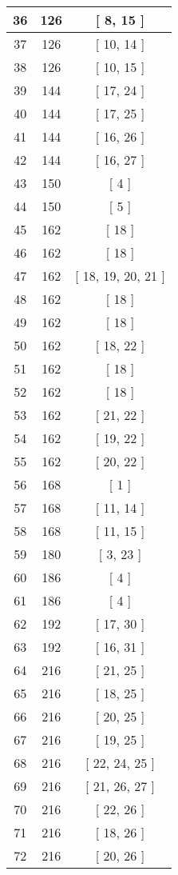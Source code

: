 \begin{center}
\begin{longtable}[H]{|| c c c ||}
36 & 126 & [ 8, 15 ] \\ 
\hline
37 & 126 & [ 10, 14 ] \\ 
\hline
38 & 126 & [ 10, 15 ] \\ 
\hline
39 & 144 & [ 17, 24 ] \\ 
\hline
40 & 144 & [ 17, 25 ] \\ 
\hline
41 & 144 & [ 16, 26 ] \\ 
\hline
42 & 144 & [ 16, 27 ] \\ 
\hline
43 & 150 & [ 4 ] \\ 
\hline
44 & 150 & [ 5 ] \\ 
\hline
45 & 162 & [ 18 ] \\ 
\hline
46 & 162 & [ 18 ] \\ 
\hline
47 & 162 & [ 18, 19, 20, 21 ] \\ 
\hline
48 & 162 & [ 18 ] \\ 
\hline
49 & 162 & [ 18 ] \\ 
\hline
50 & 162 & [ 18, 22 ] \\ 
\hline
51 & 162 & [ 18 ] \\ 
\hline
52 & 162 & [ 18 ] \\ 
\hline
53 & 162 & [ 21, 22 ] \\ 
\hline
54 & 162 & [ 19, 22 ] \\ 
\hline
55 & 162 & [ 20, 22 ] \\ 
\hline
56 & 168 & [ 1 ] \\ 
\hline
57 & 168 & [ 11, 14 ] \\ 
\hline
58 & 168 & [ 11, 15 ] \\ 
\hline
59 & 180 & [ 3, 23 ] \\ 
\hline
60 & 186 & [ 4 ] \\ 
\hline
61 & 186 & [ 4 ] \\ 
\hline
62 & 192 & [ 17, 30 ] \\ 
\hline
63 & 192 & [ 16, 31 ] \\ 
\hline
64 & 216 & [ 21, 25 ] \\ 
\hline
65 & 216 & [ 18, 25 ] \\ 
\hline
66 & 216 & [ 20, 25 ] \\ 
\hline
67 & 216 & [ 19, 25 ] \\ 
\hline
68 & 216 & [ 22, 24, 25 ] \\ 
\hline
69 & 216 & [ 21, 26, 27 ] \\ 
\hline
70 & 216 & [ 22, 26 ] \\ 
\hline
71 & 216 & [ 18, 26 ] \\ 
\hline
72 & 216 & [ 20, 26 ] \\ 

\end{longtable}
\end{center}
